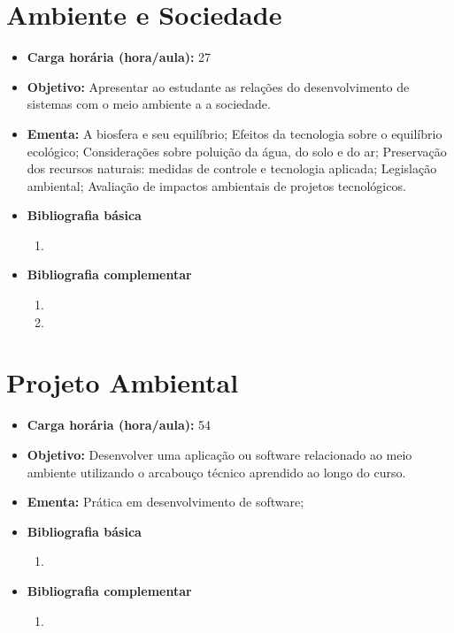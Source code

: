 \documentclass[11pt,fleqn]{book} %
\begin{document}
\section{Ambiente e Sociedade}\label{3_educamb}
\begin{itemize}
	\item \textbf{Carga horária (hora/aula):} 27
	\item \textbf{Objetivo:} Apresentar ao estudante as relações do desenvolvimento de sistemas com o meio ambiente a a sociedade.
	\item \textbf{Ementa:} 
	A biosfera e seu equilíbrio;
	Efeitos da tecnologia sobre o equilíbrio ecológico;
	Considerações sobre poluição da água, do solo e do ar;
	Preservação dos recursos naturais: medidas de controle e tecnologia aplicada;
	Legislação ambiental;
	Avaliação de impactos ambientais de projetos tecnológicos.
	\item \textbf{Bibliografia básica}
	\begin{enumerate}
		\item 
	\end{enumerate}
	\item \textbf{Bibliografia complementar}
	\begin{enumerate}
		\item
		\item 
	\end{enumerate}
\end{itemize}


\newpage
\section{Projeto Ambiental}\label{3_projamb}
\begin{itemize}
	\item \textbf{Carga horária (hora/aula):} 54
	\item \textbf{Objetivo:} Desenvolver uma aplicação ou software relacionado ao meio ambiente utilizando o arcabouço técnico aprendido ao longo do curso.
	\item \textbf{Ementa:} 
	Prática em desenvolvimento de software;
	\item \textbf{Bibliografia básica}
	\begin{enumerate}
		\item 
	\end{enumerate}
	\item \textbf{Bibliografia complementar}
	\begin{enumerate}
		\item 	
	\end{enumerate}	
\end{itemize}
\end{document}
